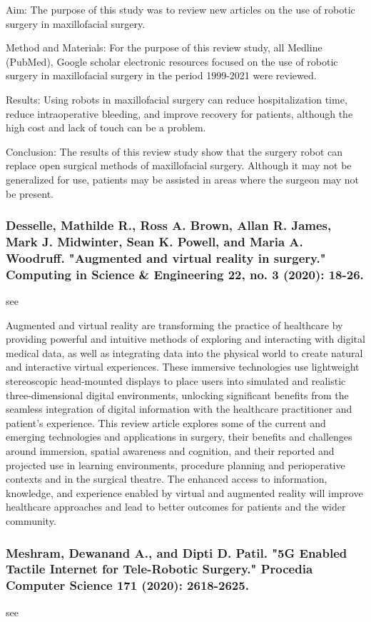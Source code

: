 \documentclass[conference]{IEEEtran}
\begin{document}
Aim: The purpose of this study was to review new articles on the use of robotic surgery in maxillofacial surgery.

Method and Materials: For the purpose of this review study, all Medline (PubMed), Google scholar electronic resources focused on the use of robotic surgery in maxillofacial surgery in the period 1999-2021 were reviewed.

Results: Using robots in maxillofacial surgery can reduce hospitalization time, reduce intraoperative bleeding, and improve recovery for patients, although the high cost and lack of touch can be a problem.

Conclusion: The results of this review study show that the surgery robot can replace open surgical methods of maxillofacial surgery. Although it may not be generalized for use, patients may be assisted in areas where the surgeon may not be present.

\medskip
\subsubsection{Desselle, Mathilde R., Ross A. Brown, Allan R. James, Mark J. Midwinter, Sean K. Powell, and Maria A. Woodruff. "Augmented and virtual reality in surgery." Computing in Science \& Engineering 22, no. 3 (2020): 18-26.}
see \cite{desselle2020augmented}

Augmented and virtual reality are transforming the practice of healthcare by providing powerful and intuitive methods of exploring and interacting with digital medical data, as well as integrating data into the physical world to create natural and interactive virtual experiences. These immersive technologies use lightweight stereoscopic head-mounted displays to place users into simulated and realistic three-dimensional digital environments, unlocking significant benefits from the seamless integration of digital information with the healthcare practitioner and patient's experience. This review article explores some of the current and emerging technologies and applications in surgery, their benefits and challenges around immersion, spatial awareness and cognition, and their reported and projected use in learning environments, procedure planning and perioperative contexts and in the surgical theatre. The enhanced access to information, knowledge, and experience enabled by virtual and augmented reality will improve healthcare approaches and lead to better outcomes for patients and the wider community.

\medskip
\subsubsection{Meshram, Dewanand A., and Dipti D. Patil. "5G Enabled Tactile Internet for Tele-Robotic Surgery." Procedia Computer Science 171 (2020): 2618-2625.}
see \cite{meshram20205g}
\end{document}
